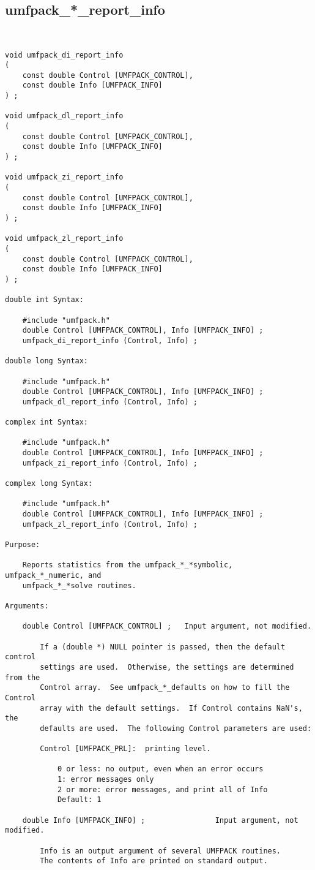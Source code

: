 \newpage
\subsection{umfpack\_*\_report\_info}

{\footnotesize
\begin{verbatim}


void umfpack_di_report_info
(
    const double Control [UMFPACK_CONTROL],
    const double Info [UMFPACK_INFO]
) ;

void umfpack_dl_report_info
(
    const double Control [UMFPACK_CONTROL],
    const double Info [UMFPACK_INFO]
) ;

void umfpack_zi_report_info
(
    const double Control [UMFPACK_CONTROL],
    const double Info [UMFPACK_INFO]
) ;

void umfpack_zl_report_info
(
    const double Control [UMFPACK_CONTROL],
    const double Info [UMFPACK_INFO]
) ;

double int Syntax:

    #include "umfpack.h"
    double Control [UMFPACK_CONTROL], Info [UMFPACK_INFO] ;
    umfpack_di_report_info (Control, Info) ;

double long Syntax:

    #include "umfpack.h"
    double Control [UMFPACK_CONTROL], Info [UMFPACK_INFO] ;
    umfpack_dl_report_info (Control, Info) ;

complex int Syntax:

    #include "umfpack.h"
    double Control [UMFPACK_CONTROL], Info [UMFPACK_INFO] ;
    umfpack_zi_report_info (Control, Info) ;

complex long Syntax:

    #include "umfpack.h"
    double Control [UMFPACK_CONTROL], Info [UMFPACK_INFO] ;
    umfpack_zl_report_info (Control, Info) ;

Purpose:

    Reports statistics from the umfpack_*_*symbolic, umfpack_*_numeric, and
    umfpack_*_*solve routines.

Arguments:

    double Control [UMFPACK_CONTROL] ;   Input argument, not modified.

        If a (double *) NULL pointer is passed, then the default control
        settings are used.  Otherwise, the settings are determined from the
        Control array.  See umfpack_*_defaults on how to fill the Control
        array with the default settings.  If Control contains NaN's, the
        defaults are used.  The following Control parameters are used:

        Control [UMFPACK_PRL]:  printing level.

            0 or less: no output, even when an error occurs
            1: error messages only
            2 or more: error messages, and print all of Info
            Default: 1

    double Info [UMFPACK_INFO] ;                Input argument, not modified.

        Info is an output argument of several UMFPACK routines.
        The contents of Info are printed on standard output.
\end{verbatim}
}

